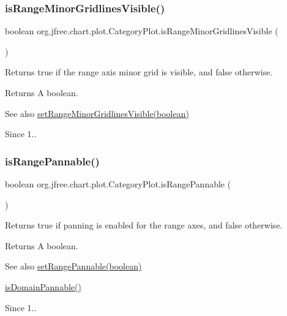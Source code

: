 \subsubsection{\texorpdfstring{is\+Range\+Minor\+Gridlines\+Visible()}{isRangeMinorGridlinesVisible()}}
{\footnotesize\ttfamily boolean org.\+jfree.\+chart.\+plot.\+Category\+Plot.\+is\+Range\+Minor\+Gridlines\+Visible (\begin{DoxyParamCaption}{ }\end{DoxyParamCaption})}

Returns {\ttfamily true} if the range axis minor grid is visible, and {\ttfamily false} otherwise.

\begin{DoxyReturn}{Returns}
A boolean.
\end{DoxyReturn}
\begin{DoxySeeAlso}{See also}
\mbox{\hyperlink{classorg_1_1jfree_1_1chart_1_1plot_1_1_category_plot_ac8ee0242646ffadffb2cdfc8ac64a14a}{set\+Range\+Minor\+Gridlines\+Visible(boolean)}}
\end{DoxySeeAlso}
\begin{DoxySince}{Since}
1.. 
\end{DoxySince}
\mbox{\label{classorg_1_1jfree_1_1chart_1_1plot_1_1_category_plot_ae919889b6b612a6f5df7f204a3356d19}} 
\subsubsection{\texorpdfstring{is\+Range\+Pannable()}{isRangePannable()}}
{\footnotesize\ttfamily boolean org.\+jfree.\+chart.\+plot.\+Category\+Plot.\+is\+Range\+Pannable (\begin{DoxyParamCaption}{ }\end{DoxyParamCaption})}

Returns {\ttfamily true} if panning is enabled for the range axes, and {\ttfamily false} otherwise.

\begin{DoxyReturn}{Returns}
A boolean.
\end{DoxyReturn}
\begin{DoxySeeAlso}{See also}
\mbox{\hyperlink{classorg_1_1jfree_1_1chart_1_1plot_1_1_category_plot_ac8f35c81ce79745391ed6d160a1d8ddd}{set\+Range\+Pannable(boolean)}} 

\mbox{\hyperlink{classorg_1_1jfree_1_1chart_1_1plot_1_1_category_plot_ac365d760808474f7b01fb0642a956f93}{is\+Domain\+Pannable()}}
\end{DoxySeeAlso}
\begin{DoxySince}{Since}
1.. 
\end{DoxySince}


